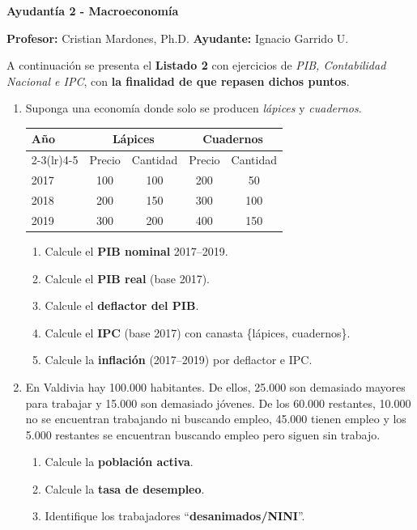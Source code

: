 \documentclass[11pt,addpoints]{article}
\begin{document}
\vspace*{0.05cm} %


\begin{center}
{\Large \bfseries Ayudantía 2 - Macroeconomía \\[0.5cm]}
\end{center}
\textbf{Profesor:} Cristian Mardones, Ph.D. \quad \textbf{Ayudante:} Ignacio Garrido U.
\bigskip

A continuación se presenta el \textbf{Listado 2} con ejercicios de \textit{PIB, Contabilidad Nacional e IPC}, con \textbf{la finalidad de que repasen dichos puntos}.

\begin{enumerate}

\item Suponga una economía donde solo se producen \emph{lápices} y \emph{cuadernos}.\\
\begin{center}
\begin{tabular}{lcccc}
\toprule
\multirow{2}{*}{\textbf{Año}} & \multicolumn{2}{c}{\textbf{Lápices}} & \multicolumn{2}{c}{\textbf{Cuadernos}}\\
\cmidrule(lr){2-3}\cmidrule(lr){4-5}
 & Precio & Cantidad & Precio & Cantidad\\
\midrule
2017 & 100 & 100 & 200 & 50\\
2018 & 200 & 150 & 300 & 100\\
2019 & 300 & 200 & 400 & 150\\
\bottomrule
\end{tabular}
\end{center}
\begin{enumerate}[label=(\alph*)]
\item Calcule el \textbf{PIB nominal} 2017–2019.
\item Calcule el \textbf{PIB real} (base 2017).
\item Calcule el \textbf{deflactor del PIB}.
\item Calcule el \textbf{IPC} (base 2017) con canasta \{lápices, cuadernos\}.
\item Calcule la \textbf{inflación} (2017–2019) por deflactor e IPC.
\end{enumerate}

\item  En Valdivia hay 100.000 habitantes. De ellos, 25.000 son demasiado mayores para trabajar
y 15.000 son demasiado jóvenes. De los 60.000 restantes, 10.000 no se encuentran trabajando ni
buscando empleo, 45.000 tienen empleo y los 5.000 restantes se encuentran buscando empleo
pero siguen sin trabajo.
\begin{enumerate}[label=(\alph*)]
\item Calcule la \textbf{población activa}.
\item Calcule la \textbf{tasa de desempleo}.
\item Identifique los trabajadores “\textbf{desanimados/NINI}”.
\end{enumerate}


\end{enumerate}
\end{document}
